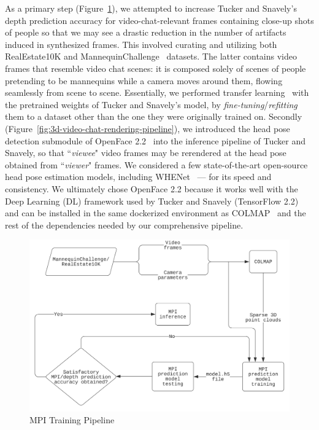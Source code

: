 As a primary step (Figure~\ref{fig:mpi-training-pipeline}), we attempted to increase Tucker and Snavely's depth prediction accuracy for video-chat-relevant frames containing close-up shots of people so that we may see a drastic reduction in the number of artifacts induced in synthesized frames. This involved curating and utilizing both RealEstate10K and MannequinChallenge~\cite{li2019learning} datasets. The latter contains video frames that resemble video chat scenes: it is composed solely of scenes of people pretending to be mannequins while a camera moves around them, flowing seamlessly from scene to scene. Essentially, we performed transfer learning~\cite{radhakrishnan_what_2019} with the pretrained weights of Tucker and Snavely's model, by \textit{fine-tuning}/\textit{refitting} them to a dataset other than the one they were originally trained on. Secondly (Figure~\ref{fig:3d-video-chat-rendering-pipeline}), we introduced the head pose detection submodule of OpenFace 2.2~\cite{baltrusaitis_openface_2018} into the inference pipeline of Tucker and Snavely, so that ``\textit{viewee}" video frames may be rerendered at the head pose obtained from ``\textit{viewer}" frames. We considered a few state-of-the-art open-source head pose estimation models, including WHENet~\cite{zhou_whenet_2020} --- for its speed and consistency. We ultimately chose OpenFace 2.2 because it works well with the Deep Learning (DL) framework used by Tucker and Snavely (TensorFlow 2.2) and can be installed in the same dockerized environment as COLMAP~\cite{schoenberger2016sfm,schoenberger2016mvs} and the rest of the dependencies needed by our comprehensive pipeline. 

\begin{figure}[!h]
    \includegraphics[width=1\columnwidth]{figures/mpi-training-pipeline.png}
    \caption{MPI Training Pipeline}
    \label{fig:mpi-training-pipeline}
\end{figure}

